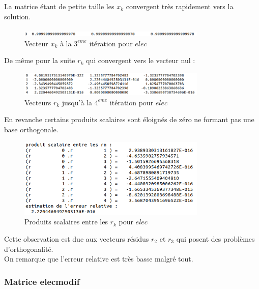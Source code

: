 \documentclass[12,french]{report}
\begin{document}
La matrice étant de petite taille les $x_{k}$ convergent très rapidement vers la solution.\\

\begin{figure}[htb!]
	\centering
	\includegraphics[width=0.8\textwidth]{./Images/x_elec}
	\caption{Vecteur $x_{k}$ à la $3^{eme}$ itération pour $elec$}
\end{figure}\vspace{0.2cm}

De même pour la suite $r_{k}$ qui convergent vers le vecteur nul :

\begin{figure}[htb!]
	\centering
	\includegraphics[width=0.8\textwidth]{./Images/r_elec}
	\caption{Vecteurs $r_{k}$ jusqu'à la $4^{eme}$ itération pour $elec$}
\end{figure}\vspace{0.2cm}

En revanche certains produits scalaires sont éloignés de zéro ne formant pas une base orthogonale. 

\begin{figure}[htb!]
	\centering
	\includegraphics[width=0.8\textwidth]{./Images/ps_elec}
	\caption{Produits scalaires entre les $r_{k}$ pour $elec$}
\end{figure}\vspace{0.2cm}

Cette observation est due aux vecteurs résidus $r_{2}$ et $r_{3}$ qui posent des problèmes d'orthogonalité.\\

On remarque que l'erreur relative est très basse malgré tout.

\subsubsection{Matrice elecmodif}
\end{document}
